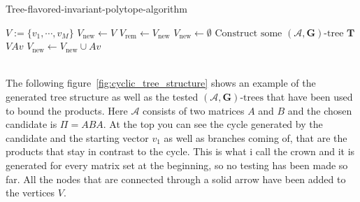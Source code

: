 \vspace{1cm}

\begin{algorithm}
  \caption{Tree-flavored-invariant-polytope-algorithm}
  \label{alg:hybrid}
  \begin{algorithmic}
      \State $V := \{v_1, \cdots, v_M\}$
      \State $V_{\text{new}} \gets V$
          \State $V_{\text{rem}} \gets V_{\text{new}}$
          \State $V_{\text{new}} \gets \emptyset$
              \State $\text{Construct some } (\mathcal{A},\mathbf{G})\text{-tree } \mathbf{T}$
                      \State $V Av$
                      \State $V_{\text{new}} \gets V_{\text{new}} \cup Av$
                  \EndIf
              \EndFor
          \EndFor
      \EndWhile \\
      \Return \\
  \end{algorithmic}
\end{algorithm}

\vspace{1cm}

The following figure~\ref{fig:cyclic_tree_structure} shows an example of the generated tree structure as well as the tested $(\mathcal{A},\mathbf{G})\text{-trees}$ that have been used to bound the products. Here $\mathcal{A}$ consists of two matrices $A$ and $B$ and the chosen candidate is $ \Pi = ABA$. At the top you can see the cycle generated by the candidate and the starting vector $v_1$ as well as branches coming of, that are the products that stay in contrast to the cycle. This is what i call the crown and it is generated for every matrix set at the beginning, so no testing has been made so far. All the nodes that are connected through a solid arrow have been added to the vertices $V$.

